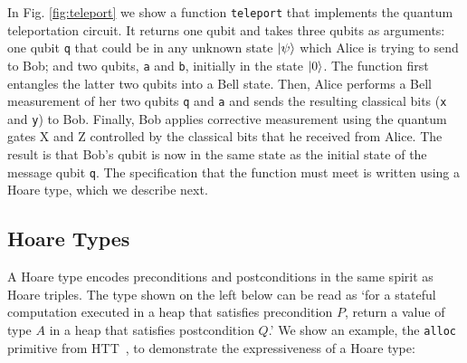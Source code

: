 \documentclass[acmsmall,nonacm,timestamp,review]{acmart}
\begin{document}
In Fig. \ref{fig:teleport} we show a function \lstinline{teleport} that implements the quantum teleportation circuit. It returns one qubit and takes three qubits as arguments: one qubit \lstinline{q} that could be in any unknown state $\ket{\psi}$ which Alice is trying to send to Bob; and two qubits, \lstinline{a} and \lstinline{b}, initially in the state $\ket{0}$. The function first entangles the latter two qubits into a Bell state. Then, Alice performs a Bell measurement of her two qubits \lstinline{q} and \lstinline{a} and sends the resulting classical bits (\lstinline{x} and \lstinline{y}) to Bob. Finally, Bob applies corrective measurement using the quantum gates X and Z controlled by the classical bits that he received from Alice. The result is that Bob's qubit is now in the same state as the initial state of the message qubit \lstinline{q}. The specification that the function must meet is written using a Hoare type, which we describe next.

\subsection{Hoare Types}
A Hoare type encodes preconditions and postconditions in the same spirit as Hoare triples. The type shown on the left below can be read as `for a stateful computation executed in a heap that satisfies precondition $P$, return a value of type $A$ in a heap that satisfies postcondition $Q$.' We show an example, the \lstinline{alloc} primitive from HTT~\cite{nanevski_hoare_2008}, to demonstrate the expressiveness of a Hoare type:
\end{document}

